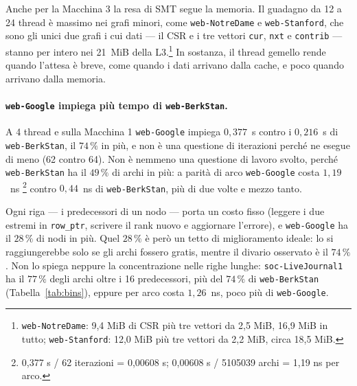 \documentclass[11pt,a4paper]{article}
\newcommand{\stacco}{\par\medskip\noindent}
\begin{document}
\stacco
Anche per la Macchina 3 la resa di SMT segue la memoria. Il
guadagno da 12 a 24 thread è massimo nei grafi minori, come
\texttt{web-NotreDame} e \texttt{web-Stanford}, che sono gli unici due grafi i cui
dati --- il CSR e i tre vettori \texttt{cur}, \texttt{nxt} e
\texttt{contrib} --- stanno per intero nei 21~MiB della
L3.\footnote{\texttt{web-NotreDame}: 9,4 MiB di CSR più tre vettori
da 2,5 MiB, 16,9 MiB in tutto; \texttt{web-Stanford}: 12,0 MiB più tre
vettori da 2,2 MiB, circa 18,5 MiB.}
In sostanza, il thread gemello rende quando l'attesa è breve, come
quando i dati arrivano dalla cache, e poco quando arrivano dalla memoria.

\paragraph{\texttt{web-Google} impiega più tempo di \texttt{web-BerkStan}.}
A 4 thread e sulla Macchina 1 \texttt{web-Google} impiega $0{,}377$~s contro i $0{,}216$~s di \texttt{web-BerkStan}, il $74\,\%$
in più, e non è una questione di iterazioni perché ne esegue di meno (62 contro 64).
Non è nemmeno una questione di lavoro
svolto, perché \texttt{web-BerkStan} ha il $49\,\%$ di archi in più: a parità di
arco \texttt{web-Google} costa $1{,}19$~ns
\footnote{0,377 s  /  62 iterazioni = 0,00608 s; 0,00608 s  /  5105039 archi = 1,19 ns per arco.}
contro $0{,}44$~ns di \texttt{web-BerkStan}, più di due volte e mezzo tanto.

\stacco
Ogni riga --- i predecessori di un nodo --- porta un costo fisso (leggere i due
estremi in \texttt{row\_ptr}, scrivere il rank nuovo e aggiornare l'errore),
e \texttt{web-Google} ha il $28\,\%$ di nodi
in più. Quel $28\,\%$ è però un tetto di miglioramento ideale:
lo si raggiungerebbe solo se gli archi
fossero gratis, mentre il divario osservato è il $74\,\%$.
Non lo spiega neppure la concentrazione nelle righe lunghe:
\texttt{soc-LiveJournal1} ha il $77\,\%$ degli
archi oltre i 16 predecessori, più del $74\,\%$ di
\texttt{web-BerkStan} (Tabella~\ref{tab:bins}), eppure per arco costa
$1{,}26$~ns, poco più di \texttt{web-Google}.
\end{document}
